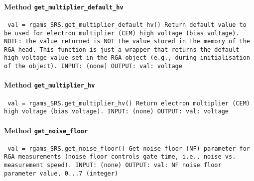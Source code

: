 \paragraph{Method \texttt{get_multiplier_default_hv}}
\vspace{1ex}
\texttt{\newline
val = rgams_SRS.get_multiplier_default_hv()\newline
\newline
Return default value to be used for electron multiplier (CEM) high voltage (bias voltage).\newline
NOTE: the value returned is NOT the value stored in the memory of the RGA head. This function is just a wrapper that returns the default high voltage value set in the RGA object (e.g., during initialisation of the object).\newline
\newline
INPUT:\newline
(none)\newline
\newline
OUTPUT:\newline
val: voltage\newline
\newline
}

\paragraph{Method \texttt{get_multiplier_hv}}
\vspace{1ex}
\texttt{\newline
val = rgams_SRS.get_multiplier_hv()\newline
\newline
Return electron multiplier (CEM) high voltage (bias voltage).\newline
\newline
INPUT:\newline
(none)\newline
\newline
OUTPUT:\newline
val: voltage\newline
\newline
}

\paragraph{Method \texttt{get_noise_floor}}
\vspace{1ex}
\texttt{\newline
val = rgams_SRS.get_noise_floor()\newline
\newline
Get noise floor (NF) parameter for RGA measurements (noise floor controls gate time, i.e., noise vs. measurement speed).\newline
\newline
INPUT:\newline
(none)\newline
\newline
OUTPUT:\newline
val: NF noise floor parameter value, 0...7 (integer)\newline
\newline
}

